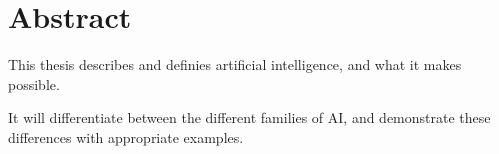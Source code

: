 \chapter*{Abstract}
This thesis describes and definies artificial intelligence, and what it makes possible. 

It will differentiate between the different families of AI, and demonstrate these differences with appropriate examples.


